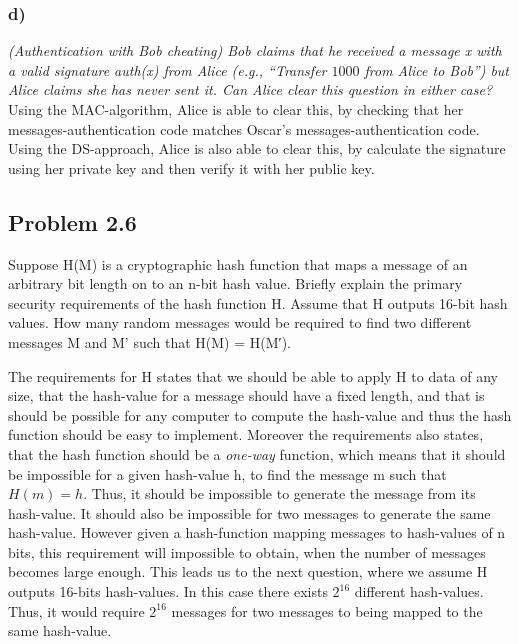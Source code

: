 \documentclass{article}
\begin{document}
\subsubsection{d)}
\textit{(Authentication with Bob cheating) Bob claims that he received a message x with a valid signature auth(x) from Alice (e.g., “Transfer $1000$ from Alice to Bob”) but Alice claims she has never sent it. Can Alice clear this question in either case?}\\ 

Using the MAC-algorithm, Alice is able to clear this, by checking that her messages-authentication code matches Oscar's messages-authentication code. \\ 

Using the DS-approach, Alice is also able to clear this, by calculate the signature using her private key and then verify it with her public key.

\subsection{Problem 2.6}
Suppose H(M) is a cryptographic hash function that maps a message of an arbitrary bit length on to an n-bit hash value. Briefly explain the primary security requirements of the hash function H. Assume that H outputs 16-bit hash values. How many random messages would be required to find two different messages M and M' such that H(M) = H(M′).

The requirements for H states that we should be able to apply H to data of any size, that the hash-value for a message should have a fixed length, and that is should be possible for any computer to compute the hash-value and thus the hash function should be easy to implement. Moreover the requirements also states, that the hash function should be a \textit{one-way} function, which means that it should be impossible for a given hash-value h, to find the message m such that $H(m) = h$. Thus, it should be impossible to generate the message from its hash-value. It should also be impossible for two messages to generate the same hash-value. However given a hash-function mapping messages to hash-values of n bits, this requirement will impossible to obtain, when the number of messages becomes large enough. This leads us to the next question, where we assume H outputs 16-bits hash-values. In this case there exists $2^{16}$ different hash-values. Thus, it would require $2^{16}$ messages for two messages to being mapped to the same hash-value. 
\end{document}
